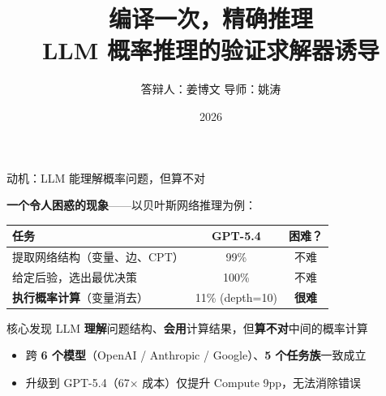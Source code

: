 \documentclass[aspectratio=169,10pt]{beamer}
\title{编译一次，精确推理\\[4pt]
{\normalsize LLM 概率推理的验证求解器诱导}}
\author{答辩人：姜博文 \quad 导师：姚涛}
\institute{上海交通大学 安泰经济与管理学院}
\date{2026}
\newcommand{\pos}[1]{\textcolor{positive}{#1}}
\newcommand{\con}[1]{\textcolor{negative}{#1}}
\begin{document}
\begin{frame}[plain]
\titlepage
\end{frame}

\begin{frame}{动机：LLM 能理解概率问题，但算不对}
\vspace{4pt}

\textbf{一个令人困惑的现象}——以贝叶斯网络推理为例：

\vspace{6pt}
\begin{center}
\begin{tabular}{@{}p{7cm}cc@{}}
\toprule
\textbf{任务} & \textbf{GPT-5.4} & \textbf{困难？} \\
\midrule
提取网络结构（变量、边、CPT）& \pos{99\%} & 不难 \\
给定后验，选出最优决策 & \pos{100\%} & 不难 \\
\textbf{执行概率计算}（变量消去）& \con{11\%} {\scriptsize (depth=10)} & \textbf{很难} \\
\bottomrule
\end{tabular}
\end{center}

\vspace{4pt}
\begin{alertblock}{核心发现}
LLM \textbf{理解}问题结构、\textbf{会用}计算结果，但\textbf{算不对}中间的概率计算
\end{alertblock}

\vspace{4pt}
\begin{itemize}
    \item 跨 \textbf{6 个模型}（OpenAI / Anthropic / Google）、\textbf{5 个任务族}一致成立
    \item 升级到 GPT-5.4（67× 成本）仅提升 Compute 9pp，无法消除错误
\end{itemize}
\end{frame}
\end{document}
